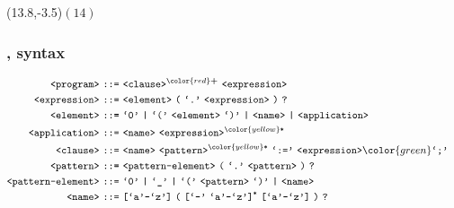 \begin{frame}

\begin{textblock}{1}(13.8,-3.5)$(14)$\end{textblock}

\frametitle{\D{}, syntax}

\begin{align*}
\nonterm{program}\ \textt{::=}&\ \nonterm{clause}^{\color{red}\textt{\bf +}}
\ \nonterm{expression}
& \\
\nonterm{expression}\ \textt{::=}&\ \nonterm{element}\ \textt{(}\ \term{.}
\ \nonterm{expression}\ \textt{)}\ \textt{?}
& \\
\nonterm{element}\ \textt{::=}&\ \term{0}\ \textt{|}\ \term{(}
\ \nonterm{element}\ \term{)}\ \textt{|}\ \nonterm{name}\ \textt{|}
\ \nonterm{application}
& \\
\nonterm{application}\ \textt{::=}&\ \nonterm{name}
\ \nonterm{expression}^{\color{yellow}\textt{*}}
& \\
\nonterm{clause}\ \textt{::=}&\ \nonterm{name}
\ \nonterm{pattern}^{\color{yellow}\textt{*}}\ \term{:=}
\ \nonterm{expression}{\color{green}\term{;}}
& \\
\nonterm{pattern}\ \textt{::=}&\ \nonterm{pattern-element}\ \textt{(}
\ \term{.}\ \nonterm{pattern}\ \textt{)}\ \textt{?}
& \\
\nonterm{pattern-element}\ \textt{::=}&\ \term{0}\ \textt{|}\ \term{\_}
\ \textt{|}\ \term{(}\ \nonterm{pattern}\ \term{)}\ \textt{|}\ \nonterm{name}
& \\
\nonterm{name}\ \textt{::=}&\ \textt{[}\term{a}\mathmono{-}\term{z}\textt{]}
\ \textt{(}\ \textt{[}\term{-}\ \term{a}\mathmono{-}\term{z}\textt{]}^\textt{*}
\ \textt{[}\term{a}\mathmono{-}\term{z}\textt{]}\ \textt{)}\ \textt{?}
\end{align*}




\end{frame}
